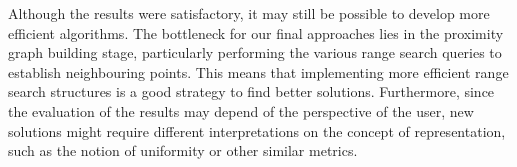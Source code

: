 Although the results were satisfactory, it may still be possible to develop more efficient algorithms. The bottleneck for our final approaches lies in the proximity graph building stage, particularly performing the various range search queries to establish neighbouring points. This means that implementing more efficient range search structures is a good strategy to find better solutions. Furthermore, since the evaluation of the results may depend of the perspective of the user, new solutions might require different interpretations on the concept of representation, such as the notion of uniformity or other similar metrics. 
